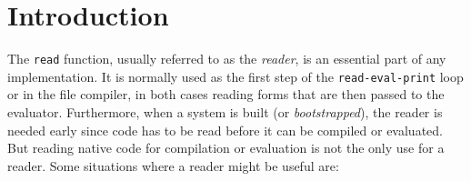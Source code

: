 \section{Introduction}

The \cl{}\cite{ansi:common:lisp} \texttt{read} function, usually
referred to as the \emph{reader}, is an essential part of any \cl{}
implementation.  It is normally used as the first step of the
\texttt{read-eval-print} loop or in the file compiler, in both cases
reading forms that are then passed to the evaluator.  Furthermore,
when a \cl{} system is built (or \emph{bootstrapped}), the reader is
needed early since code has to be read before it can be compiled or
evaluated.  But reading native code for compilation or evaluation is
not the only use for a reader.  Some situations where a reader might
be useful are:

